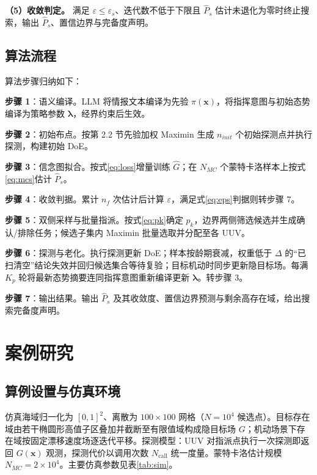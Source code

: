 \documentclass[a4paper,UTF8,zihao=5,twocolumn]{ctexart}
\numberwithin{equation}{section}
\begin{document}
\textbf{（5）收敛判定。} 满足 $\varepsilon\leq\varepsilon_s$、迭代数不低于下限且 $\hat P_s$ 估计未退化为零时终止搜索，输出 $\hat P_s$、置信边界与完备度声明。

\subsection{算法流程}

算法步骤归纳如下：

\textbf{步骤 1}：语义编译。LLM 将情报文本编译为先验 $\pi(\symbf{x})$，将指挥意图与初始态势编译为策略参数 $\symbf{\lambda}$，经界约束后生效。

\textbf{步骤 2}：初始布点。按第 2.2 节先验加权 Maximin 生成 $n_{init}$ 个初始探测点并执行探测，构建初始 DoE。

\textbf{步骤 3}：信念图拟合。按式\eqref{eq:loss}增量训练 $\hat G$；在 $N_{MC}$ 个蒙特卡洛样本上按式\eqref{eq:mcs}估计 $\hat P_s$。

\textbf{步骤 4}：收敛判据。累计 $n_f$ 次估计后计算 $\varepsilon$，满足式\eqref{eq:eps}判据则转步骤 7。

\textbf{步骤 5}：双侧采样与批量指派。按式\eqref{eq:pk}确定 $p_k$，边界两侧筛选候选并生成确认/排除任务；候选子集内 Maximin 批量选取并分配至各 UUV。

\textbf{步骤 6}：探测与老化。执行探测更新 DoE；样本按龄期衰减，权重低于 $\Delta$ 的“已扫清空”结论失效并回归候选集合等待复验；目标机动时同步更新隐目标场。每满 $K_p$ 轮将最新态势摘要连同指挥意图重新编译更新 $\symbf{\lambda}$。转步骤 3。

\textbf{步骤 7}：输出结果。输出 $\hat P_s$ 及其收敛度、置信边界预测与剩余高存在域，给出搜索完备度声明。

\section{案例研究}

\subsection{算例设置与仿真环境}

仿真海域归一化为 $[0,1]^2$、离散为 $100\times100$ 网格（$N=10^4$ 候选点）。目标存在域由若干椭圆形高值子区叠加并截断至有限值域构成隐目标场 $G$；机动场景下存在域按固定漂移速度场逐迭代平移。探测模型：UUV 对指派点执行一次探测即返回 $G(\symbf{x})$ 观测，探测代价以调用次数 $N_{\mathrm{call}}$ 统一度量。蒙特卡洛估计规模 $N_{MC}=2\times10^4$。主要仿真参数见表\ref{tab:sim}。
\end{document}
